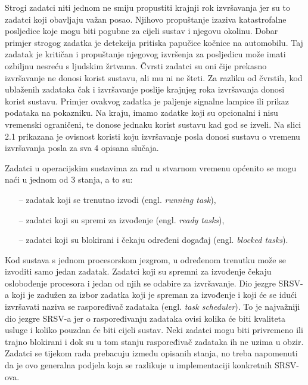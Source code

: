 \documentclass[../zavrsni.tex]{subfiles}
\begin{document}
Strogi zadatci niti jednom ne smiju propustiti krajnji rok izvršavanja jer su to zadatci koji obavljaju važan posao. Njihovo 
propuštanje izaziva katastrofalne posljedice koje mogu biti pogubne za cijeli sustav i njegovu okolinu. Dobar primjer strogog zadatka je detekcija 
pritiska papučice kočnice na automobilu. Taj zadatak je kritičan i propuštanje njegovog izvršenja za posljedicu može imati ozbiljnu
nesreću s ljudskim žrtvama. Čvrsti zadatci su oni čije prekasno izvršavanje ne donosi korist sustavu, ali mu ni ne šteti.
Za razliku od čvrstih, kod ublaženih zadataka čak i izvršavanje poslije krajnjeg roka izvršavanja donosi korist sustavu.
Primjer ovakvog zadatka je paljenje signalne lampice ili prikaz podataka na pokazniku.
Na kraju, imamo zadatke koji su opcionalni i nisu vremenski ograničeni, te donose jednaku korist sustavu kad god se izveli.
Na slici 2.1 prikazana je ovisnost koristi koju izvršavanje posla donosi sustavu o vremenu izvršavanja posla za sva 4 opisana slučaja.

Zadatci u operacijskim sustavima za rad u stvarnom vremenu općenito se mogu naći u jednom od 3 stanja, a to su:
\begin{itemize}
    \item[--] zadatak koji se trenutno izvodi (engl. \textit{running task}),
    \item[--] zadatci koji su spremi za izvođenje (engl. \textit{ready tasks}),
    \item[--] zadatci koji su blokirani i čekaju određeni događaj (engl. \textit{blocked tasks}).
\end{itemize}

Kod sustava s jednom procesorskom jezgrom, u određenom trenutku može se izvoditi samo jedan zadatak.
Zadatci koji su spremni za izvođenje
čekaju oslobođenje procesora i jedan od njih se odabire za izvršavanje.
Dio jezgre SRSV-a koji je zadužen za izbor zadatka koji je spreman za izvođenje i koji će se idući izvršavati naziva se raspoređivač 
zadataka (engl. \textit{task scheduler}). To je najvažniji dio jezgre SRSV-a jer o raspoređivanju zadataka ovisi kolika će biti kvaliteta usluge i
koliko pouzdan će biti cijeli sustav.
Neki zadatci mogu biti privremeno ili trajno blokirani i dok su u tom stanju raspoređivač zadataka ih ne uzima u obzir.
Zadatci se tijekom rada prebacuju između opisanih stanja, no treba napomenuti da je ovo generalna podjela koja se razlikuje u 
implementaciji konkretnih SRSV-ova.
\end{document}
